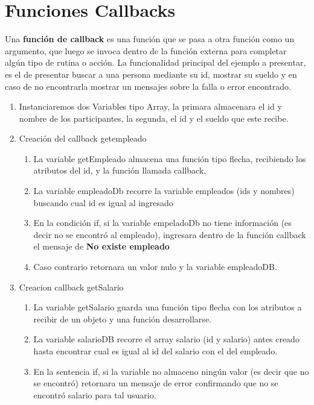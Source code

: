 \documentclass{report}
\begin{document}
\chapter{Funciones Callbacks} 
Una \textbf{función de callback} es una función que se pasa a otra función como un argumento, que luego se invoca dentro de la función externa para completar algún tipo de rutina o acción.
La funcionalidad principal del ejemplo a presentar, es el de presentar buscar a una persona mediante su id, mostrar su sueldo y en caso de no encontrarla mostrar un mensajes sobre la falla o error encontrado.\\
\begin{enumerate}
  \item Instanciaremos dos Variables tipo Array, la primara almacenara el id y nombre de los participantes, la segunda, el id y el sueldo que este recibe.
  
  \item Creación del callback getempleado
  
  \begin{enumerate}
    \item La variable getEmpleado almacena una función tipo flecha, recibiendo los atributos del id, y la función llamada callback,
    \item La variable empleadoDb recorre la variable empleados (ids y nombres) buscando cual id es igual al ingresado
    \item En la condición if, si la variable empeladoDb no tiene información (es decir no se encontró al empleado), ingresara dentro de la función callback el mensaje de \textbf{No existe empleado}
    \item Caso contrario retornara un valor nulo y la variable empleadoDB.
  \end{enumerate}
   \item Creacion callback getSalario
   
   \begin{enumerate}
    \item La variable getSalario guarda una función tipo flecha con los atributos a recibir de un objeto y una función desarrollarse.
     \item La variable salarioDB recorre el array salario (id y salario) antes creado hasta encontrar cual es igual al id del salario con el del empleado.
     \item En la sentencia if, si la variable no almaceno ningún valor (es decir que no se encontró) retornara un mensaje de error confirmando que no se encontró salario para tal usuario.

\end{enumerate}
\end{enumerate}
\end{document}
